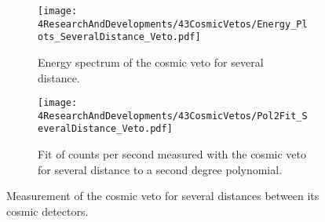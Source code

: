 



\begin{figure}
\centering
    \begin{subfigure}[b]{0.85\textwidth}
    \centering
    \texttt{[image: 4ResearchAndDevelopments/43CosmicVetos/Energy\_Plots\_SeveralDistance\_Veto.pdf]}  
    \caption{Energy spectrum of the cosmic veto for several distance.\label{subfig:EnergySpectrumsSeveralDistanceVeto}}
    \end{subfigure}
    \hfill
    \begin{subfigure}[b]{0.85\textwidth}
    \centering
    \texttt{[image: 4ResearchAndDevelopments/43CosmicVetos/Pol2Fit\_SeveralDistance\_Veto.pdf]}  
    \caption{Fit of counts per second measured with the cosmic veto for several distance to a second degree polynomial.\label{subfig:LinearFitSeveralDistanceVeto}}
    \end{subfigure}
 \caption{Measurement of the cosmic veto for several distances between its cosmic detectors.}
 \label{fig:DistanceVeto}
\end{figure}

